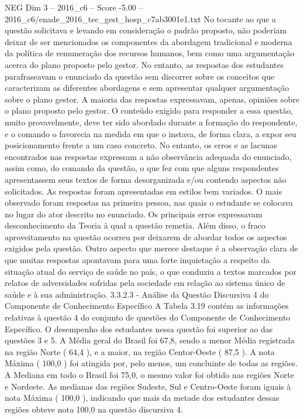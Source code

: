 \begin{textsample}{NEG Dim 3 – 2016\_c6 – Score -5.00 – 2016\_c6/enade\_2016\_tec\_gest\_hosp\_c7ab3001e1.txt}
No tocante ao que a questão solicitava e levando em consideração o padrão proposto, não poderiam deixar de ser mencionados os componentes da abordagem tradicional e moderna da política de remuneração dos recursos humanos, bem como uma argumentação acerca do plano proposto pelo gestor.
No entanto, as respostas dos estudantes parafraseavam o enunciado da questão sem discorrer sobre os conceitos que caracterizam as diferentes abordagens e sem apresentar qualquer argumentação sobre o plano gestor.
A maioria das respostas expressavam, apenas, opiniões sobre o plano proposto pelo gestor.
O conteúdo exigido para responder a essa questão, muito provavelmente, deve ter sido abordado durante a formação do respondente, e o comando o favorecia na medida em que o instava, de forma clara, a expor seu posicionamento frente a um caso concreto.
No entanto, os erros e as lacunas encontrados nas respostas expressam a não observância adequada do enunciado, assim como, do comando da questão, o que fez com que alguns respondentes apresentassem seus textos de forma desorganizada e/ou contendo aspectos não solicitados.
As respostas foram apresentadas em estilos bem variados.
O mais observado foram respostas na primeira pessoa, nas quais o estudante se colocava no lugar do ator descrito no enunciado.
Os principais erros expressavam desconhecimento da Teoria à qual a questão remetia.
Além disso, o fraco aproveitamento na questão ocorreu por deixarem de abordar todos os aspectos exigidos pela questão.
Outro aspecto que merece destaque é a observação clara de que muitas respostas apontavam para uma forte inquietação a respeito da situação atual do serviço de saúde no país, o que conduziu a textos marcados por relatos de adversidades sofridas pela sociedade em relação ao sistema único de saúde e à sua administração. 3.3.2.3 - Análise da Questão Discursiva 4 do Componente de Conhecimento Específico A Tabela 3.19 contém as informações relativas à questão 4 do conjunto de questões do Componente de Conhecimento Específico.
O desempenho dos estudantes nessa questão foi superior ao das questões 3 e 5.
A Média geral do Brasil foi 67,8, sendo a menor Média registrada na região Norte ( 64,4 ), e a maior, na região Centor-Oeste ( 87,5 ).
A nota Máxima ( 100,0 ) foi atingida por, pelo menos, um concluinte de todas as regiões.
A Mediana em todo o Brasil foi 75,0, o mesmo valor foi obtido nas regiões Norte e Nordeste.
As medianas das regiões Sudeste, Sul e Centro-Oeste foram iguais à nota Máxima ( 100,0 ), indicando que mais da metade dos estudantes dessas regiões obteve nota 100,0 na questão discursiva 4.

\end{textsample}
